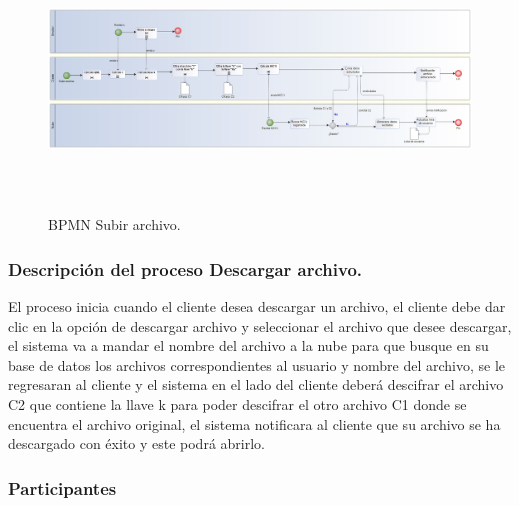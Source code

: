 \begin{figure}[H]
\centering
	\includegraphics[width=16cm, height=7cm]{./images/BPM_Subir.png}
	\caption{BPMN Subir archivo.}

\end{figure}


\subsubsection{Descripción del proceso Descargar archivo.}

El proceso inicia cuando el cliente desea descargar un archivo, el cliente debe dar clic en la opción de descargar archivo y seleccionar el archivo que desee descargar, el sistema va a mandar el nombre del archivo a la nube para que busque en su base de datos los archivos correspondientes al usuario y nombre del archivo, se le regresaran al cliente y el sistema en el lado del cliente deberá descifrar el archivo C2 que contiene la llave k para poder descifrar el otro archivo C1 donde se encuentra el archivo original, el sistema notificara al cliente que su archivo se ha descargado con éxito y este podrá abrirlo. \\


\subsubsection{Participantes}

